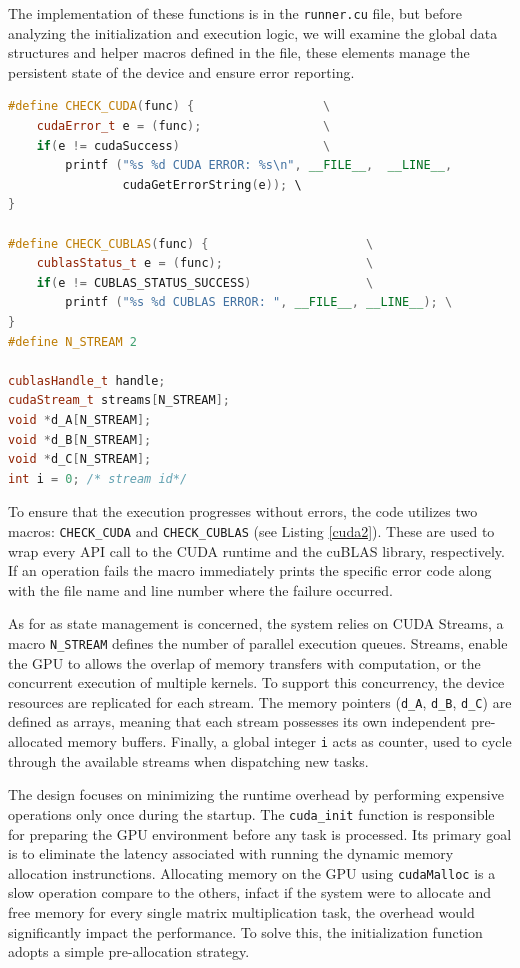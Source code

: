 The implementation of these functions is in the \texttt{runner.cu} file, but before analyzing the initialization and execution logic, we will examine the global data structures and helper macros defined in the file, these elements manage the persistent state of the device and ensure error reporting. 

\begin{lstlisting}[caption={cuda\_runner.cu data and helper}, language=C++, label={cuda2}] 
#define CHECK_CUDA(func) {				    \
    cudaError_t e = (func);			        \
    if(e != cudaSuccess)			        \
        printf ("%s %d CUDA ERROR: %s\n", __FILE__,  __LINE__, 
                cudaGetErrorString(e)); \
}

#define CHECK_CUBLAS(func) {                      \
    cublasStatus_t e = (func);                    \
    if(e != CUBLAS_STATUS_SUCCESS)                \
        printf ("%s %d CUBLAS ERROR: ", __FILE__, __LINE__); \
}
#define N_STREAM 2

cublasHandle_t handle;  
cudaStream_t streams[N_STREAM];
void *d_A[N_STREAM]; 
void *d_B[N_STREAM]; 
void *d_C[N_STREAM];
int i = 0; /* stream id*/
\end{lstlisting}

To ensure that the execution progresses without errors, the code utilizes two macros: \texttt{CHECK\_CUDA} and \texttt{CHECK\_CUBLAS} (see Listing \ref{cuda2}). These are used to wrap every API call to the CUDA runtime and the cuBLAS library, respectively. If an operation fails the macro immediately prints the specific error code along with the file name and line number where the failure occurred.

As for as state management is concerned, the system relies on CUDA Streams, a macro \texttt{N\_STREAM} defines the number of parallel execution queues. Streams, enable the GPU to allows the overlap of memory transfers with computation, or the concurrent execution of multiple kernels. To support this concurrency, the device resources are replicated for each stream. The memory pointers (\texttt{d\_A}, \texttt{d\_B}, \texttt{d\_C}) are defined as arrays, meaning that each stream possesses its own independent pre-allocated memory buffers. Finally, a global integer \texttt{i} acts as counter, used to cycle through the available streams when dispatching new tasks.

The design focuses on minimizing the runtime overhead by performing expensive operations only once during the startup.  The \texttt{cuda\_init} function is responsible for preparing the GPU environment before any task is processed. Its primary goal is to eliminate the latency associated with running the dynamic memory allocation instrunctions. Allocating memory on the GPU using \texttt{cudaMalloc} is a slow operation compare to the others, infact if the system were to allocate and free memory for every single matrix multiplication task, the overhead would significantly impact the performance. To solve this, the initialization function adopts a simple pre-allocation strategy. 

